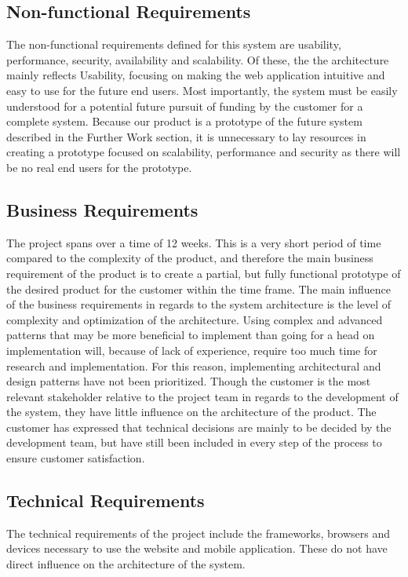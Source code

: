 \subsection{Non-functional Requirements}
\label{subsec:ArchDriversNonfunctional}
The non-functional requirements defined for this system are usability, performance, security, availability and scalability. Of these, the the architecture mainly reflects Usability, focusing on making the web application intuitive and easy to use for the future end users. Most importantly, the system must be easily understood for a potential future pursuit of funding by the customer for a complete system. Because our product is a prototype of the future system described in the Further Work section, it is unnecessary to lay resources in creating a prototype focused on scalability, performance and security as there will be no real end users for the prototype.

\subsection{Business Requirements}
\label{subsec:ArchDriversBusiness}
The project spans over a time of 12 weeks. This is a very short period of time compared to the complexity of the product, and therefore the main business requirement of the product is to create a partial, but fully functional prototype of the desired product for the customer within the time frame. The main influence of the business requirements in regards to the system architecture is the level of complexity and optimization of the architecture. Using complex and advanced patterns that may be more beneficial to implement than going for a head on implementation will, because of lack of experience, require too much time for research and implementation. For this reason, implementing architectural and design patterns have not been prioritized. Though the customer is the most relevant stakeholder relative to the project team in regards to the development of the system, they have little influence on the architecture of the product. The customer has expressed that technical decisions are mainly to be decided by the development team, but have still been included in every step of the process to ensure customer satisfaction.

\subsection{Technical Requirements}
\label{subsec:ArchDriversTechnical}
The technical requirements of the project include the frameworks, browsers and devices necessary to use the website and mobile application. These do not have direct influence on the architecture of the system. 


